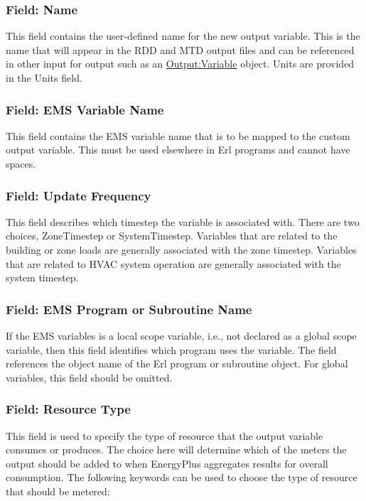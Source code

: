 \subsubsection{Field: Name}\label{field-name-6-006}

This field contains the user-defined name for the new output variable. This is the name that will appear in the RDD and MTD output files and can be referenced in other input for output such as an \hyperref[outputvariable]{Output:Variable} object. Units are provided in the Units field.

\subsubsection{Field: EMS Variable Name}\label{field-ems-variable-name-1}

This field contains the EMS variable name that is to be mapped to the custom output variable. This must be used elsewhere in Erl programs and cannot have spaces.

\subsubsection{Field: Update Frequency}\label{field-update-frequency-1}

This field describes which timestep the variable is associated with. There are two choices, ZoneTimestep or SystemTimestep. Variables that are related to the building or zone loads are generally associated with the zone timestep. Variables that are related to HVAC system operation are generally associated with the system timestep.

\subsubsection{Field: EMS Program or Subroutine Name}\label{field-ems-program-or-subroutine-name-1}

If the EMS variables is a local scope variable, i.e., not declared as a global scope variable, then this field identifies which program uses the variable. The field references the object name of the Erl program or subroutine object. For global variables, this field should be omitted.

\subsubsection{Field: Resource Type}\label{field-resource-type}

This field is used to specify the type of resource that the output variable consumes or produces. The choice here will determine which of the meters the output should be added to when EnergyPlus aggregates results for overall consumption. The following keywords can be used to choose the type of resource that should be metered:


